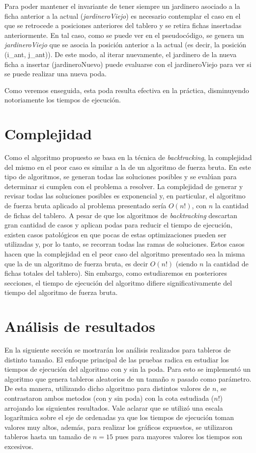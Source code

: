 \documentclass[a4paper,10pt] {article}
\begin{document}
Para poder mantener el invariante de tener siempre un jardinero asociado a la ficha anterior a la actual (\textit{jardineroViejo}) es necesario contemplar el caso en el que se retrocede a posiciones anteriores del tablero y se retira fichas insertadas anteriormente. En tal caso, como se puede ver en el pseudoc\'odigo, se genera un \textit{jardineroViejo} que se asocia la posici\'on anterior a la actual (es decir, la posici\'on (i\_ant, j\_ant)). De este modo, al iterar nuevamente, el jardinero de la nueva ficha a insertar (jardineroNuevo) puede evaluarse con el jardineroViejo para ver si se puede realizar una nueva poda.

Como veremos enseguida, esta poda resulta efectiva en la pr\'actica, disminuyendo notoriamente los tiempos de ejecuci\'on.

\section*{Complejidad}

Como el algoritmo propuesto se basa en la t\'ecnica de \textit{backtracking}, la complejidad del mismo en el peor caso es similar a la de un algoritmo de fuerza bruta. En este tipo de algoritmos, se generan todas las soluciones posibles y se eval\'uan para determinar si cumplen con el problema a resolver. La complejidad de generar y revisar todas las soluciones posibles es exponencial y, en particular, el algoritmo de fuerza bruta aplicado al problema presentado ser\'ia $O(n!)$, con $n$ la cantidad de fichas del tablero. A pesar de que los algoritmos de \textit{backtracking} descartan gran cantidad de casos y aplican podas para reducir el tiempo de ejecuci\'on, existen casos patol\'ogicos en que pocas de estas optimizaciones pueden ser utilizadas y, por lo tanto, se recorran todas las ramas de soluciones. Estos casos hacen que la complejidad en el peor caso del algoritmo presentado sea la misma que la de un algoritmo de fuerza bruta, es decir $O(n!)$ (siendo $n$ la cantidad de fichas totales del tablero). Sin embargo, como estudiaremos en posteriores secciones, el tiempo de ejecuci\'on del algoritmo difiere significativamente del tiempo del algoritmo de fuerza bruta.

\section*{An\'alisis de resultados}

En la siguiente secci\'on se mostrar\'an los an\'alisis realizados para tableros de distinto tama\~{n}o. El enfoque principal de las pruebas radica en estudiar los tiempos de ejecuci\'on del algoritmo con y sin la poda. Para esto se implement\'o un algoritmo que genera tableros aleatorios de un tama\~{n}o $n$ pasado como par\'ametro. De esta manera, utilizando dicho algoritmo para distintos valores de $n$, se contrastaron ambos metodos (con y sin poda) con la cota estudiada ($n!$) arrojando los siguientes resultados. Vale aclarar que se utiliz\'o una escala logar\'itmica sobre el eje de ordenadas ya que los tiempos de ejecuci\'on toman valores muy altos, adem\'as, para realizar los gr\'aficos expuestos, se utilizaron tableros hasta un tama\~{n}o de $n=15$ pues para mayores valores los tiempos son excesivos.
\end{document}

